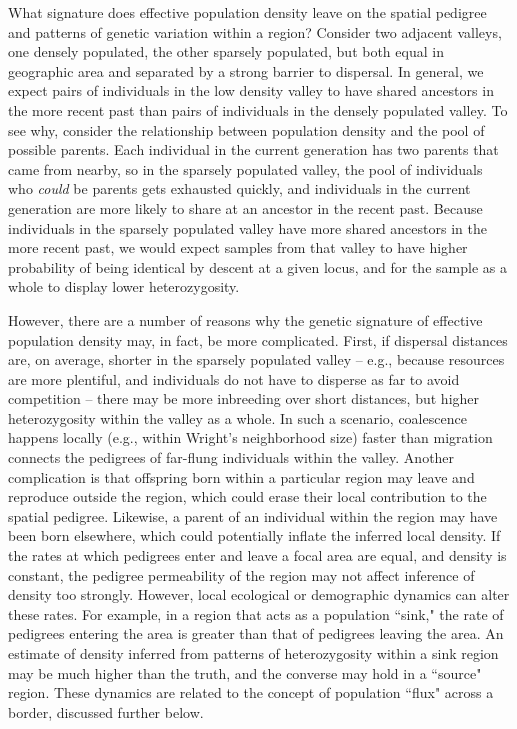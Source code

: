 \documentclass{ar-1col}
\begin{document}
What signature does effective population density leave 
on the spatial pedigree and patterns of genetic variation
within a region?
Consider two adjacent valleys, 
one densely populated, the other sparsely populated, 
but both equal in geographic area 
and separated by a strong barrier to dispersal.
In general, we expect pairs of individuals in the low density valley 
to have shared ancestors in the more recent past than 
pairs of individuals in the densely populated valley.
To see why, consider the relationship between population density
and the pool of possible parents.
Each individual in the current generation has two parents that came from nearby,
so in the sparsely populated valley,
the pool of individuals who \emph{could} be parents gets exhausted quickly,
and individuals in the current generation
are more likely to share at an ancestor in the recent past.
Because individuals in the sparsely populated valley have more shared ancestors 
in the more recent past, 
we would expect samples from that valley to have higher probability of being identical by descent 
at a given locus, 
and for the sample as a whole to display lower heterozygosity.

However, there are a number of reasons why the genetic signature 
of effective population density may, in fact, be more complicated.
First, if dispersal distances are, on average, shorter 
in the sparsely populated valley -- 
e.g., because resources are more plentiful, 
and individuals do not have to disperse as far to avoid competition -- 
there may be more inbreeding over short distances, 
but higher heterozygosity within the valley as a whole.
In such a scenario, coalescence happens locally 
(e.g., within Wright's neighborhood size)
faster than migration connects the pedigrees of 
far-flung individuals within the valley.
Another complication is that offspring born within a particular region 
may leave and reproduce outside the region, 
which could erase their local contribution to the spatial pedigree.
Likewise, a parent of an individual within the region 
may have been born elsewhere, 
which could potentially inflate the inferred local density.
If the rates at which pedigrees enter and leave a focal area are equal, 
and density is constant, 
the pedigree permeability of the region may not affect inference of density too strongly.
However, local ecological or demographic dynamics 
can alter these rates.
For example, in a region that acts as a population ``sink,"
the rate of pedigrees entering the area is greater than 
that of pedigrees leaving the area.
An estimate of density inferred from patterns of heterozygosity 
within a sink region may be much higher than the truth, 
and the converse may hold in a ``source" region.
These dynamics are related to the concept of population ``flux" 
across a border, discussed further below.
\end{document}
